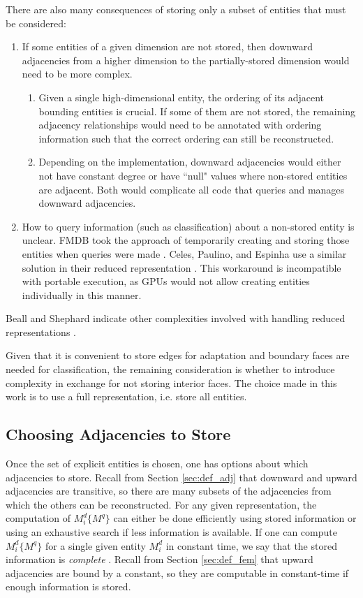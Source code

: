 There are also many consequences of storing only a subset of entities that
must be considered:
\begin{enumerate}
\item If some entities of a given dimension are not stored, then
downward adjacencies from a higher dimension to the partially-stored dimension
would need to be more complex.
\begin{enumerate}
\item Given a single high-dimensional entity, the ordering of its
adjacent bounding entities is crucial.
If some of them are not stored, the remaining adjacency relationships
would need to be annotated with ordering information such that the correct
ordering can still be reconstructed.
\item Depending on the implementation, downward adjacencies would either
not have constant degree or have ``null" values where non-stored entities
are adjacent.
Both would complicate all code that queries and manages
downward adjacencies.
\end{enumerate}
\item How to query information (such as classification) about a non-stored
entity is unclear. FMDB took the approach of temporarily creating
and storing those entities when queries were made \cite{seol2005fmdb}.
Celes, Paulino, and Espinha use a similar solution in their reduced
representation \cite{celes2005compact}.
This workaround is incompatible with portable execution, as GPUs
would not allow creating entities individually in this manner.
\end{enumerate}
Beall and Shephard indicate other complexities involved
with handling reduced representations \cite{beall1997general}.

Given that it is convenient to store edges for adaptation and boundary
faces are needed for classification,
the remaining consideration is whether to introduce
complexity in exchange for not storing interior faces.
The choice made in this work is to use a full representation,
i.e. store all entities.

\subsection{Choosing Adjacencies to Store}

Once the set of explicit entities is chosen, one has
options about which adjacencies to store.
Recall from Section \ref{sec:def_adj} that downward and upward
adjacencies are transitive, so there are many
subsets of the adjacencies from which the others
can be reconstructed.
For any given representation, the computation of $M^d_i\{M^q\}$
can either be done efficiently using stored information
or using an exhaustive search if less information is available.
If one can compute $M^d_i\{M^q\}$ for a single
given entity $M^d_i$ in constant time,
we say that the stored information is {\it complete} \cite{seol2006efficient}.
Recall from Section \ref{sec:def_fem} that upward adjacencies
are bound by a constant, so they are computable in
constant-time if enough information is stored.


